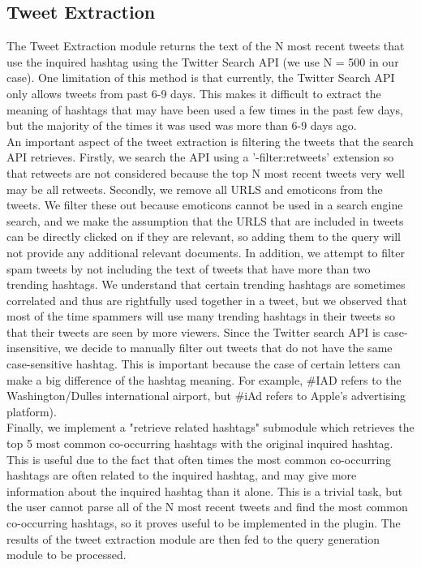 \documentclass{sig-alternate}
\begin{document}
\subsection{Tweet Extraction}
The Tweet Extraction module returns the text of the N most recent tweets that use the inquired hashtag using the Twitter Search API (we use N = 500 in our case). One limitation of this method is that currently, the Twitter Search API  only allows tweets from past 6-9 days. This makes it difficult to extract the meaning of hashtags that may have been used a few times in the past few days, but the majority of the times it was used was more than 6-9 days ago. \\
An important aspect of the tweet extraction is filtering the tweets that the search API retrieves. Firstly, we search the API using a '-filter:retweets' extension so that retweets are not considered because the top N most recent tweets very well may be all retweets. Secondly, we remove all URLS and emoticons from the tweets. We filter these out because emoticons cannot be used in a search engine search, and we make the assumption that the URLS that are included in tweets can be directly clicked on if they are relevant, so adding them to the query will not provide any additional relevant documents. In addition, we attempt to filter spam tweets by not including the text of tweets that have more than two trending hashtags. We understand that certain trending hashtags are sometimes correlated and thus are rightfully used together in a tweet, but we observed that most of the time spammers will use many trending hashtags in their tweets so that their tweets are seen by more viewers.
Since the Twitter search API is case-insensitive, we decide to manually filter out tweets that do not have the same case-sensitive hashtag. This is important because the case of certain letters can make a big difference of the hashtag meaning. For example, \#IAD refers to the Washington/Dulles international airport, but \#iAd refers to Apple's advertising platform). \\
Finally, we implement a "retrieve related hashtags" submodule which retrieves the top 5 most common co-occurring hashtags with the original inquired hashtag. This is useful due to the fact that often times the most common co-occurring hashtags are often related to the inquired hashtag, and may give more information about the inquired hashtag than it alone. This is a trivial task, but the user cannot parse all of the N most recent tweets and find the most common co-occurring hashtags, so it proves useful to be implemented in the plugin. The results of the tweet extraction module are then fed to the query generation module to be processed.
\end{document}
